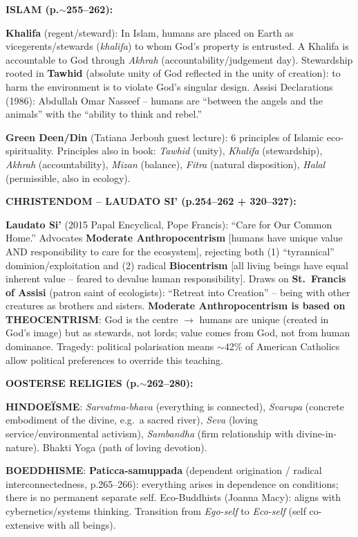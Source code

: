 \documentclass[a4paper,10pt]{article}
\begin{document}
\textbf{ISLAM (p.$\sim$255--262):}

\textbf{Khalifa} (regent/steward): In Islam, humans are placed on Earth as vicegerents/stewards (\textit{khalifa}) to whom God's property is entrusted. A Khalifa is accountable to God through \textit{Akhrah} (accountability/judgement day). Stewardship rooted in \textbf{Tawhid} (absolute unity of God reflected in the unity of creation): to harm the environment is to violate God's singular design. Assisi Declarations (1986): Abdullah Omar Nasseef -- humans are ``between the angels and the animals'' with the ``ability to think and rebel.''

\textbf{Green Deen/Din} (Tatiana Jerbouh guest lecture): 6 principles of Islamic eco-spirituality. Principles also in book: \textit{Tawhid} (unity), \textit{Khalifa} (stewardship), \textit{Akhrah} (accountability), \textit{Mizan} (balance), \textit{Fitra} (natural disposition), \textit{Halal} (permissible, also in ecology).

\textbf{CHRISTENDOM -- LAUDATO SI' (p.254--262 + 320--327):}

\textbf{Laudato Si'} (2015 Papal Encyclical, Pope Francis): ``Care for Our Common Home.'' Advocates \textbf{Moderate Anthropocentrism} [humans have unique value AND responsibility to care for the ecosystem], rejecting both (1) ``tyrannical'' dominion/exploitation and (2) radical \textbf{Biocentrism} [all living beings have equal inherent value -- feared to devalue human responsibility]. Draws on \textbf{St.\ Francis of Assisi} (patron saint of ecologists): ``Retreat into Creation'' -- being with other creatures as brothers and sisters. \textbf{Moderate Anthropocentrism is based on THEOCENTRISM}: God is the centre $\to$ humans are unique (created in God's image) but as stewards, not lords; value comes from God, not from human dominance. Tragedy: political polarisation means $\sim$42\% of American Catholics allow political preferences to override this teaching.

\textbf{OOSTERSE RELIGIES (p.$\sim$262--280):}

\textbf{HINDOEÏSME}: \textit{Sarvatma-bhava} (everything is connected), \textit{Svarupa} (concrete embodiment of the divine, e.g.\ a sacred river), \textit{Seva} (loving service/environmental activism), \textit{Sambandha} (firm relationship with divine-in-nature). Bhakti Yoga (path of loving devotion).

\textbf{BOEDDHISME}: \textbf{Paticca-samuppada} (dependent origination / radical interconnectedness, p.265--266): everything arises in dependence on conditions; there is no permanent separate self. Eco-Buddhists (Joanna Macy): aligns with cybernetics/systems thinking. Transition from \textit{Ego-self} to \textit{Eco-self} (self co-extensive with all beings).
\end{document}
